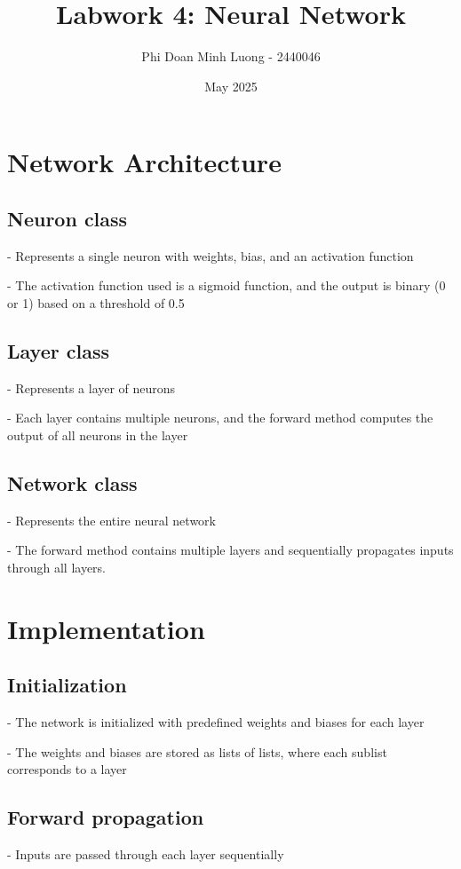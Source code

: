 \documentclass{article}
\title{Labwork 4: Neural Network}
\author{Phi Doan Minh Luong - 2440046}
\date{May 2025}
\begin{document}
\maketitle

\setlength\parindent{0pt}

\section{Network Architecture}

\subsection{Neuron class}
- Represents a single neuron with weights, bias, and an activation function

- The activation function used is a sigmoid function, and the output is binary (0 or 1) based on a threshold of 0.5

\subsection{Layer class}
- Represents a layer of neurons

- Each layer contains multiple neurons, and the forward method computes the output of all neurons in the layer

\subsection{Network class}
- Represents the entire neural network

- The forward method contains multiple layers and sequentially propagates inputs through all layers.

\section{Implementation}
\subsection{Initialization}
- The network is initialized with predefined weights and biases for each layer

- The weights and biases are stored as lists of lists, where each sublist corresponds to a layer

\subsection{Forward propagation}
- Inputs are passed through each layer sequentially
\end{document}

